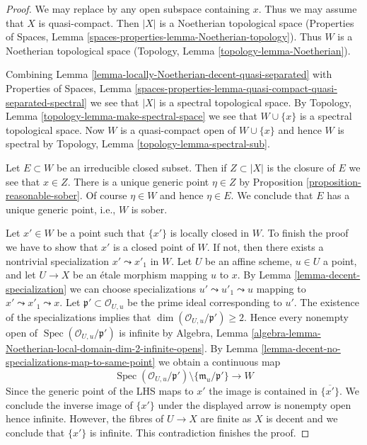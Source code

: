 \documentclass{stacks-project}
\theoremstyle{plain}
\theoremstyle{definition}
\theoremstyle{remark}
\numberwithin{equation}{subsection}
\def\Spec{\mathop{\mathrm{Spec}}}
\begin{document}
\begin{proof}
We may replace by any open subspace containing $x$.
Thus we may assume that $X$ is quasi-compact.
Then $|X|$ is a Noetherian topological space
(Properties of Spaces, Lemma \ref{spaces-properties-lemma-Noetherian-topology}).
Thus $W$ is a Noetherian topological space
(Topology, Lemma \ref{topology-lemma-Noetherian}).

\medskip\noindent
Combining Lemma \ref{lemma-locally-Noetherian-decent-quasi-separated} with
Properties of Spaces, Lemma
\ref{spaces-properties-lemma-quasi-compact-quasi-separated-spectral}
we see that $|X|$ is a spectral topological space.
By Topology, Lemma \ref{topology-lemma-make-spectral-space}
we see that $W \cup \{x\}$ is a spectral topological space.
Now $W$ is a quasi-compact open of $W \cup \{x\}$ and hence $W$ is
spectral by Topology, Lemma \ref{topology-lemma-spectral-sub}.

\medskip\noindent
Let $E \subset W$ be an irreducible closed subset. Then if $Z \subset |X|$
is the closure of $E$ we see that $x \in Z$. There is a unique generic
point $\eta \in Z$ by Proposition \ref{proposition-reasonable-sober}.
Of course $\eta \in W$ and hence $\eta \in E$. We conclude that $E$
has a unique generic point, i.e., $W$ is sober.

\medskip\noindent
Let $x' \in W$ be a point such that $\{x'\}$ is locally closed in $W$.
To finish the proof we have to show that $x'$ is a closed point of $W$.
If not, then there exists a nontrivial specialization $x' \leadsto x'_1$
in $W$. Let $U$ be an affine scheme, $u \in U$ a point, and let $U \to X$
be an \'etale morphism mapping $u$ to $x$. By
Lemma \ref{lemma-decent-specialization}
we can choose specializations $u' \leadsto u'_1 \leadsto u$
mapping to $x' \leadsto x'_1 \leadsto x$.
Let $\mathfrak p' \subset \mathcal{O}_{U, u}$ be the prime ideal
corresponding to $u'$. The existence of the specializations
implies that $\dim(\mathcal{O}_{U, u}/\mathfrak p') \geq 2$.
Hence every nonempty open of $\Spec(\mathcal{O}_{U, u}/\mathfrak p')$
is infinite by Algebra, Lemma
\ref{algebra-lemma-Noetherian-local-domain-dim-2-infinite-opens}.
By Lemma \ref{lemma-decent-no-specializations-map-to-same-point}
we obtain a continuous map
$$
\Spec(\mathcal{O}_{U, u}/\mathfrak p')
\setminus \{\mathfrak m_u/\mathfrak p'\}
\longrightarrow
W
$$
Since the generic point of the LHS maps to $x'$ the image is
contained in $\overline{\{x'\}}$. We conclude the inverse image of $\{x'\}$
under the displayed arrow is nonempty open hence infinite.
However, the fibres of $U \to X$ are finite as $X$
is decent and we conclude that $\{x'\}$ is infinite.
This contradiction finishes the proof.
\end{proof}
\end{document}
